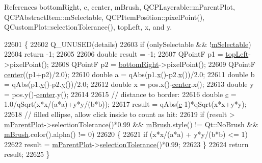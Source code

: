 References bottom\+Right, c, center, m\+Brush, Q\+C\+P\+Layerable\+::m\+Parent\+Plot, Q\+C\+P\+Abstract\+Item\+::m\+Selectable, Q\+C\+P\+Item\+Position\+::pixel\+Point(), Q\+Custom\+Plot\+::selection\+Tolerance(), top\+Left, x, and y.


\begin{DoxyCode}
22601 \{
22602   Q\_UNUSED(details)
22603   if (onlySelectable && !\hyperlink{class_q_c_p_abstract_item_ad81eb35c8726a0f458db9df9732e0e41}{mSelectable})
22604     return -1;
22605   
22606   \textcolor{keywordtype}{double} result = -1;
22607   QPointF p1 = \hyperlink{class_q_c_p_item_ellipse_a12fd8420c06718d0c8a2303d6a652848}{topLeft}->pixelPoint();
22608   QPointF p2 = \hyperlink{class_q_c_p_item_ellipse_ab73c8deafc0d8d1ef7d75b6cdcc37159}{bottomRight}->pixelPoint();
22609   QPointF \hyperlink{class_q_c_p_item_ellipse_a8b6dd0e854f99239c5806ffdf2f590b3}{center}((p1+p2)/2.0);
22610   \textcolor{keywordtype}{double} a = qAbs(p1.\hyperlink{_comparision_pictures_2_createtest_image_8m_a9336ebf25087d91c818ee6e9ec29f8c1}{x}()-p2.\hyperlink{_comparision_pictures_2_createtest_image_8m_a9336ebf25087d91c818ee6e9ec29f8c1}{x}())/2.0;
22611   \textcolor{keywordtype}{double} b = qAbs(p1.\hyperlink{_comparision_pictures_2_createtest_image_8m_a2fb1c5cf58867b5bbc9a1b145a86f3a0}{y}()-p2.\hyperlink{_comparision_pictures_2_createtest_image_8m_a2fb1c5cf58867b5bbc9a1b145a86f3a0}{y}())/2.0;
22612   \textcolor{keywordtype}{double} x = pos.x()-\hyperlink{class_q_c_p_item_ellipse_a8b6dd0e854f99239c5806ffdf2f590b3}{center}.x();
22613   \textcolor{keywordtype}{double} y = pos.y()-\hyperlink{class_q_c_p_item_ellipse_a8b6dd0e854f99239c5806ffdf2f590b3}{center}.y();
22614   
22615   \textcolor{comment}{// distance to border:}
22616   \textcolor{keywordtype}{double} \hyperlink{_comparision_pictures_2_createtest_image_8m_ae0323a9039add2978bf5b49550572c7c}{c} = 1.0/qSqrt(x*x/(a*a)+y*y/(b*b));
22617   result = qAbs(\hyperlink{_comparision_pictures_2_createtest_image_8m_ae0323a9039add2978bf5b49550572c7c}{c}-1)*qSqrt(x*x+y*y);
22618   \textcolor{comment}{// filled ellipse, allow click inside to count as hit:}
22619   if (result > \hyperlink{class_q_c_p_layerable_aa2a528433e44db02b8aef23c1f9f90ed}{mParentPlot}->selectionTolerance()*0.99 && \hyperlink{class_q_c_p_item_ellipse_a6fa59478cd3ad1b10e6c1f6cedc84bd6}{mBrush}.style() != Qt::NoBrush && 
      \hyperlink{class_q_c_p_item_ellipse_a6fa59478cd3ad1b10e6c1f6cedc84bd6}{mBrush}.color().alpha() != 0)
22620   \{
22621     \textcolor{keywordflow}{if} (x*x/(a*a) + y*y/(b*b) <= 1)
22622       result = \hyperlink{class_q_c_p_layerable_aa2a528433e44db02b8aef23c1f9f90ed}{mParentPlot}->\hyperlink{class_q_custom_plot_a7b738074c75e80070ef6a10263c6cd69}{selectionTolerance}()*0.99;
22623   \}
22624   \textcolor{keywordflow}{return} result;
22625 \}
\end{DoxyCode}



